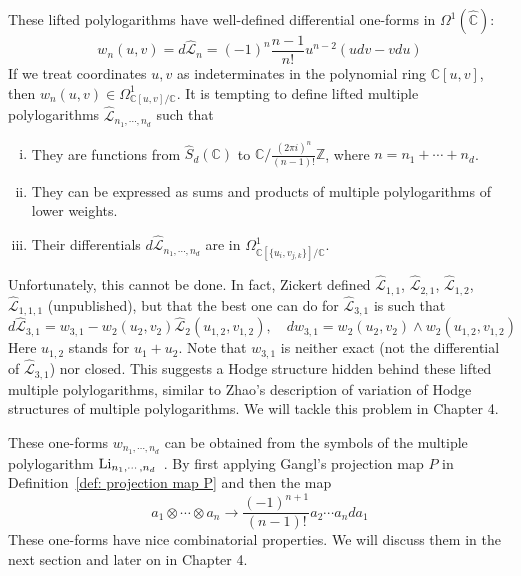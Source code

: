 These lifted polylogarithms have well-defined differential one-forms in $\Omega^1(\widehat{\mathbb C})$:
\begin{equation}\label{eq: dL_n}
w_n(u,v)=d\widehat{\mathcal L}_n=(-1)^n\frac{n-1}{n!}u^{n-2}(udv-vdu)
\end{equation}
If we treat coordinates $u,v$ as indeterminates in the polynomial ring $\mathbb C[u,v]$, then $w_n(u,v)\in\Omega^1_{\mathbb C[u,v]/\mathbb C}$. It is tempting to define lifted multiple polylogarithms $\widehat{\mathcal L}_{n_1,\cdots,n_d}$ such that
\begin{enumerate}[i.]
\item They are functions from $\widehat S_d(\mathbb C)$ to $\mathbb C/\frac{(2\pi i)^n}{(n-1)!}\mathbb Z$, where $n=n_1+\cdots+n_d$.
\item They can be expressed as sums and products of multiple polylogarithms of lower weights.
\item Their differentials $d\widehat{\mathcal L}_{n_1,\cdots,n_d}$ are in $\Omega^1_{\mathbb C[\{u_i, v_{j,k}\}]/\mathbb C}$.
\end{enumerate}
Unfortunately, this cannot be done. In fact, Zickert defined $\widehat{\mathcal L}_{1,1}$, $\widehat{\mathcal L}_{2,1}$, $\widehat{\mathcal L}_{1,2}$, $\widehat{\mathcal L}_{1,1,1}$ (unpublished), but that the best one can do for $\widehat{\mathcal L}_{3,1}$ is such that
\begin{equation}
d\widehat{\mathcal L}_{3,1}=w_{3,1}-w_2(u_2,v_2)\widehat{\mathcal L}_2(u_{1,2},v_{1,2}),\quad dw_{3,1}=w_2(u_2,v_2)\wedge w_2(u_{1,2},v_{1,2})
\end{equation}
Here $u_{1,2}$ stands for $u_1+u_2$. Note that $w_{3,1}$ is neither exact (not the differential of $\widehat{\mathcal L}_{3,1}$) nor closed. This suggests a Hodge structure hidden behind these lifted multiple polylogarithms, similar to Zhao's description of variation of Hodge structures of multiple polylogarithms. We will tackle this problem in Chapter 4.

These one-forms $w_{n_1,\cdots,n_d}$ can be obtained from the symbols of the multiple polylogarithm $\operatorname{Li}_{n_1,\cdots,n_d}$~\cite{ZDHZ_HopfAlgebrasOfMultiplePolylogarithmsAndHolomorphicOneForms}. By first applying Gangl's projection map $P$ in Definition~\ref{def: projection map P} and then the map
\begin{equation}\label{eq: symmetrized symbol to one-form}
a_1\otimes\cdots\otimes a_n\to\frac{(-1)^{n+1}}{(n-1)!}a_2\cdots a_nda_1
\end{equation}
These one-forms have nice combinatorial properties. We will discuss them in the next section and later on in Chapter 4.

